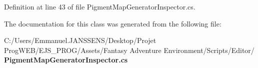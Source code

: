 Definition at line 43 of file Pigment\+Map\+Generator\+Inspector.\+cs.



The documentation for this class was generated from the following file\+:\begin{DoxyCompactItemize}
\item 
C\+:/\+Users/\+Emmanuel.\+J\+A\+N\+S\+S\+E\+N\+S/\+Desktop/\+Projet Prog\+W\+E\+B/\+E\+J\+S\+\_\+\+P\+R\+O\+G/\+Assets/\+Fantasy Adventure Environment/\+Scripts/\+Editor/\textbf{ Pigment\+Map\+Generator\+Inspector.\+cs}\end{DoxyCompactItemize}
